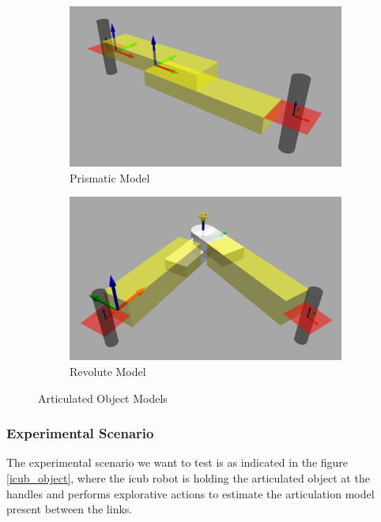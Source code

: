 \documentclass[12pt,a4paper]{report}
\begin{document}
\begin{figure}[H]
	\begin{subfigure}[b]{0.5\textwidth}
		\centering
		\includegraphics[scale=0.15]{figures/1p_2link.png}
		\caption{Prismatic Model}
		\label{pmodel}
	\end{subfigure}
	\begin{subfigure}[b]{0.5\textwidth}
		\centering
		\includegraphics[scale=0.16]{figures/1r_2link.png}
		\caption{Revolute Model}
		\label{rmodel}
	\end{subfigure}
	\caption{Articulated Object Models}
	\label{objects}
\end{figure}

\subsubsection{Experimental Scenario}
The experimental scenario we want to test is as indicated in the figure \ref{icub_object}, where the icub robot is holding the articulated object at the handles and performs explorative actions to estimate the
articulation model present between the links.
\end{document}
